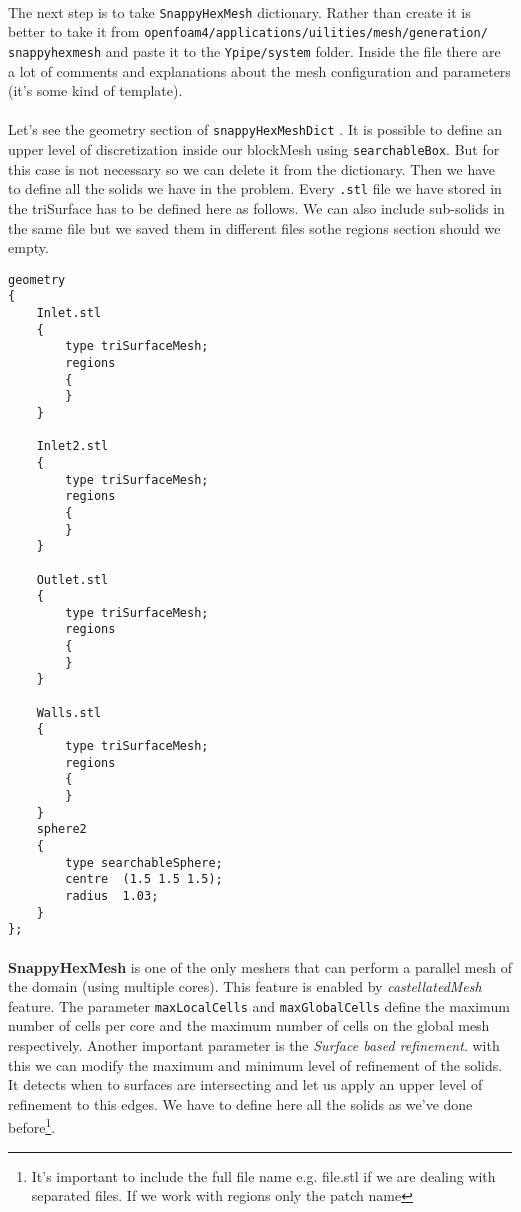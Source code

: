 \paragraph{}The next step is to take \texttt{SnappyHexMesh} dictionary. Rather than create it is better to take it from \texttt{openfoam4/applications/uilities/mesh/generation/\\snappyhexmesh} and paste it to the \texttt{Ypipe/system} folder. Inside the file there are a lot of comments and explanations about the mesh configuration and parameters (it's some kind of template).

\paragraph{}Let's see the geometry section of \texttt{snappyHexMeshDict} . It is possible to define an upper level of discretization inside our blockMesh using \texttt{searchableBox}. But for this case is not necessary so we can delete it from the dictionary. Then we have to define all the solids we have in the problem. Every \texttt{.stl} file we have stored in the triSurface has to be defined here as follows. We can also include sub-solids in the same file but we saved them in different files sothe regions section should we empty.
\begin{center}
\begin{lstlisting}
geometry
{
    Inlet.stl
    {
        type triSurfaceMesh;
        regions
        {
        }
    }

    Inlet2.stl
    {
        type triSurfaceMesh;
        regions
        {
        }
    }

    Outlet.stl
    {
        type triSurfaceMesh;
        regions
        {
        }
    }

    Walls.stl
    {
        type triSurfaceMesh;
        regions
        {
        }
    }
    sphere2
    {
        type searchableSphere;
        centre  (1.5 1.5 1.5);
        radius  1.03;
    }
};
\end{lstlisting}
\end{center}

\paragraph{}\textbf{SnappyHexMesh} is one of the only meshers that can perform a parallel mesh of the domain (using multiple cores). This feature is enabled by \emph{castellatedMesh} feature. The parameter \texttt{maxLocalCells} and \texttt{maxGlobalCells} define the maximum number of cells per core and the maximum number of cells on the global mesh respectively. Another important parameter is the \emph{Surface based refinement}. with this we can modify the maximum and minimum level of refinement of the solids. It detects when to surfaces are intersecting and let us apply an upper level of refinement to this edges. We have to define here all the solids as we've done before\footnote{It's important to include the full file name e.g. file.stl if we are dealing with separated files. If we work with regions only the patch name}.

